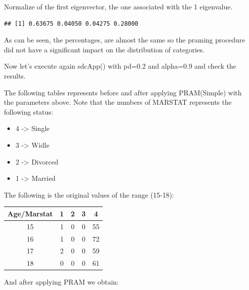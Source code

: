\documentclass[
]{article}
\newenvironment{Shaded}{\begin{snugshade}}{\end{snugshade}}
\newcommand{\DecValTok}[1]{\textcolor[rgb]{0.00,0.00,0.81}{#1}}
\newcommand{\FunctionTok}[1]{\textcolor[rgb]{0.00,0.00,0.00}{#1}}
\newcommand{\NormalTok}[1]{#1}
\newcommand{\OtherTok}[1]{\textcolor[rgb]{0.56,0.35,0.01}{#1}}
\newcommand{\SpecialCharTok}[1]{\textcolor[rgb]{0.00,0.00,0.00}{#1}}
\providecommand{\tightlist}{%
  \setlength{\itemsep}{0pt}\setlength{\parskip}{0pt}}
\begin{document}
Normalize of the first eigenvector, the one associated with the 1
eigenvalue.

\begin{Shaded}
\end{Shaded}

\begin{verbatim}
## [1] 0.63675 0.04050 0.04275 0.28000
\end{verbatim}

As can be seen, the percentages, are almost the same so the praming
procedure did not have a significant impact on the distribution of
categories.

Now let's execute again sdcApp() with pd=0.2 and alpha=0.9 and check the
results.

The following tables represents before and after applying PRAM(Simple)
with the parameters above. Note that the numbers of MARSTAT represents
the following status:

\begin{itemize}
\tightlist
\item
  4 -\textgreater{} Single
\item
  3 -\textgreater{} Widle
\item
  2 -\textgreater{} Divorced
\item
  1 -\textgreater{} Married
\end{itemize}

The following is the original values of the range (15-18):

\begin{longtable}[]{@{}ccccc@{}}
\toprule()
Age/Marstat & 1 & 2 & 3 & 4 \\
\midrule()
\endhead
15 & 1 & 0 & 0 & 55 \\
16 & 1 & 0 & 0 & 72 \\
17 & 2 & 0 & 0 & 59 \\
18 & 0 & 0 & 0 & 61 \\
\bottomrule()
\end{longtable}

And after applying PRAM we obtain:
\end{document}
